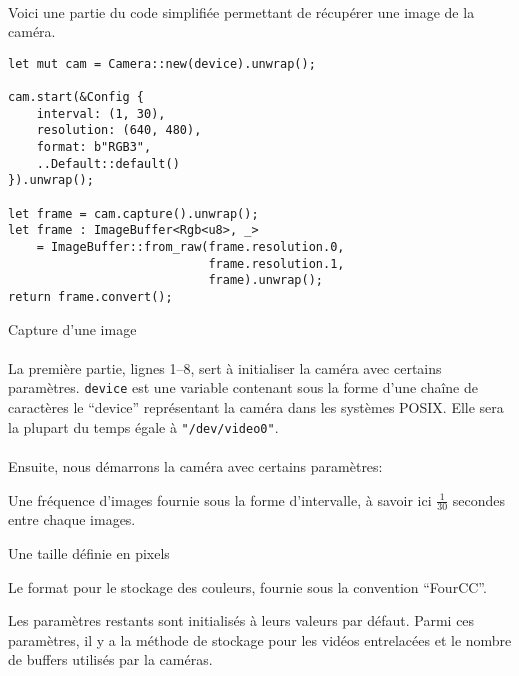 \documentclass{report}
\begin{document}
\paragraph{} Voici une partie du code simplifiée permettant de récupérer une
image de la caméra.

\begin{listing}[H]
\begin{verbatim}
let mut cam = Camera::new(device).unwrap();

cam.start(&Config {
	interval: (1, 30),
	resolution: (640, 480),
	format: b"RGB3",
	..Default::default()
}).unwrap();

let frame = cam.capture().unwrap();
let frame : ImageBuffer<Rgb<u8>, _>
	= ImageBuffer::from_raw(frame.resolution.0,
	                        frame.resolution.1,
	                        frame).unwrap();
return frame.convert();
\end{verbatim}
\label{lst:capture}
\caption{Capture d'une image}
\end{listing}

\paragraph{} La première partie, lignes 1--8, sert à initialiser la caméra avec
certains paramètres. \texttt{device} est une variable contenant sous
la forme d'une chaîne de caractères le ``device'' représentant la caméra dans
les systèmes POSIX. Elle sera la plupart du temps égale à
\texttt{"/dev/video0"}.

\paragraph{} Ensuite, nous démarrons la caméra avec certains paramètres:

\begin{description}
	\item[interval:] Une fréquence d'images fournie sous la forme d'intervalle,
		à savoir ici $\frac{1}{30}$ secondes entre chaque images.
	\item[resolution:] Une taille définie en pixels
	\item[format:] Le format pour le stockage des couleurs, fournie sous la
		convention ``FourCC''.
	\item Les paramètres restants sont initialisés à leurs valeurs par défaut.
		Parmi ces paramètres, il y a la méthode de stockage pour les vidéos
		entrelacées et le nombre de buffers utilisés par la caméras.
\end{description}
\end{document}
